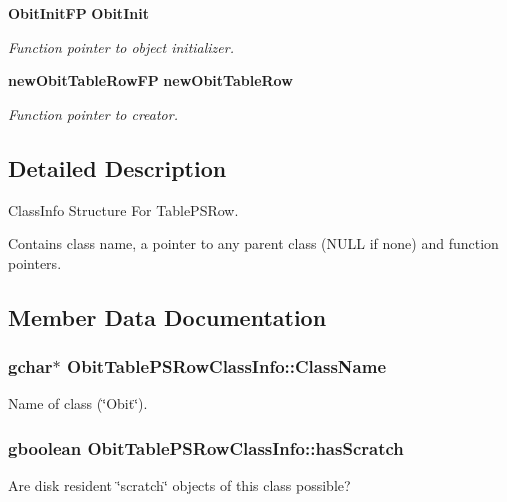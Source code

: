 \begin{CompactItemize}
{\bf Obit\-Init\-FP} {\bf Obit\-Init}
\begin{CompactList}\small\item\em Function pointer to object initializer. \item\end{CompactList}\item 
{\bf new\-Obit\-Table\-Row\-FP} {\bf new\-Obit\-Table\-Row}
\begin{CompactList}\small\item\em Function pointer to creator. \item\end{CompactList}\end{CompactItemize}


\subsection{Detailed Description}
Class\-Info Structure For Table\-PSRow. 

Contains class name, a pointer to any parent class (NULL if none) and function pointers. 



\subsection{Member Data Documentation}
\subsubsection{\setlength{\rightskip}{0pt plus 5cm}gchar$\ast$ {\bf Obit\-Table\-PSRow\-Class\-Info::Class\-Name}}\label{structObitTablePSRowClassInfo_o2}


Name of class (\char`\"{}Obit\char`\"{}). 

\subsubsection{\setlength{\rightskip}{0pt plus 5cm}gboolean {\bf Obit\-Table\-PSRow\-Class\-Info::has\-Scratch}}\label{structObitTablePSRowClassInfo_o1}


Are disk resident \char`\"{}scratch\char`\"{} objects of this class possible? 

